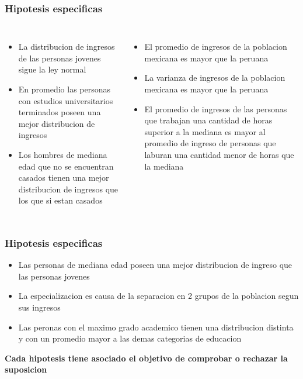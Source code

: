 \documentclass{beamer}
\begin{document}
\begin{frame}
\frametitle{Hipotesis especificas}

\begin{columns}

\begin{itemize}
    \item La distribucion de ingresos de las personas jovenes sigue
      la ley normal
    \item En \alert{promedio} las personas con
      estudios universitarios terminados poseen una mejor distribucion
      de ingresos
    \item Los hombres de mediana edad que no se encuentran casados
      tienen una mejor distribucion de ingresos que los que si estan casados
\end{itemize}


\begin{itemize}
    \item El promedio de ingresos de la poblacion mexicana es mayor
      que la peruana
    \item La varianza de ingresos de la poblacion mexicana es mayor
      que la peruana
    \item El \alert{promedio de ingresos} de las personas que trabajan
      una cantidad de horas superior a la mediana es mayor al promedio
      de ingreso de personas que laburan una cantidad menor de horas
      que la mediana
\end{itemize}
\end{columns}
\end{frame}


\begin{frame}
\frametitle{Hipotesis especificas}
  \begin{itemize}
      \item Las personas de mediana edad poseen una mejor distribucion
        de ingreso que las personas jovenes
      \item La especializacion es causa de la separacion en 2 grupos de
        la poblacion segun sus ingresos
      \item Las peronas con el maximo grado academico tienen una distribucion
        distinta y con un promedio mayor a las demas categorias de educacion
  \end{itemize}

  \textbf{Cada hipotesis tiene asociado el objetivo de comprobar
  o rechazar la suposicion}

\end{frame}
\end{document}
